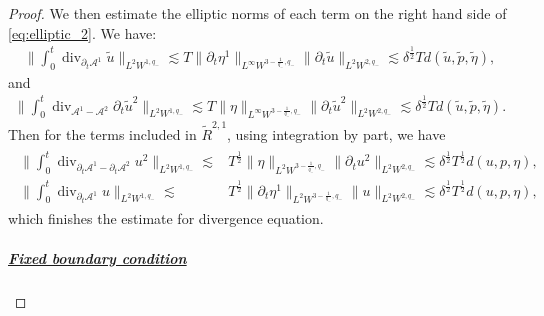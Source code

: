 \documentclass[letterpaper,reqno,10pt,twoside]{amsart}
\theoremstyle{definition}
\theoremstyle{remark}
\def\p{\partial}
\begin{document}
\begin{proof}
			\noindent We then estimate the elliptic norms of each term on the right hand side of \eqref{eq:elliptic_2}. We have:
			\begin{align}
				\|\int_{0}^{t}\operatorname{div}_{\p_{t}\mathcal{A}^{1}}\tilde{u}\|_{L^{2}W^{1,q_{-}}}\lesssim T\|\p_{t}\eta^{1}\|_{L^{\infty}W^{3-\frac{1}{q_{-}},q_{-}}}\|\p_{t}\tilde{u}\|_{L^{2}W^{2,q_{-}}}\lesssim \delta^{\frac{1}{2}}Td(\tilde{u},\tilde{p},\tilde{\eta}),
			\end{align}
			and
			\begin{align}
				\|\int_{0}^{t}\operatorname{div}_{\mathcal{A}^{1}-\mathcal{A}^{2}}\p_{t}\tilde{u}^{2}\|_{L^{2}W^{1,q_{-}}}\lesssim T\|\eta\|_{L^{\infty}W^{3-\frac{1}{q_{-}},q_{-}}}\|\p_{t}\tilde{u}^{2}\|_{L^{2}W^{2,q_{-}}}\lesssim \delta^{\frac{1}{2}}Td(\tilde{u},\tilde{p},\tilde{\eta}).
			\end{align}
			\noindent Then for the terms included in $\tilde{R}^{2,1}$, using integration by part, we have
			\begin{align}
				\begin{aligned}
					\|\int_{0}^{t}\operatorname{div}_{\p_{t}\mathcal{A}^{1}-\p_{t}\mathcal{A}^{2}}{u}^{2}\|_{L^{2}W^{1,q_{-}}}\lesssim&T^{\frac{1}{2}}\|\eta\|_{L^{2}W^{3-\frac{1}{q_{-}},q_{-}}}\|\p_{t}{u}^{2}\|_{L^{2}W^{2,q_{-}}}\lesssim \delta^{\frac{1}{2}}T^{\frac{1}{2}}d({u},{p},{\eta}),\\
					\|\int_{0}^{t}\operatorname{div}_{\p_{t}\mathcal{A}^{1}}{u}\|_{L^{2}W^{1,q_{-}}}\lesssim& T^{\frac{1}{2}}\|\p_{t}\eta^{1}\|_{L^{2}W^{3-\frac{1}{q_{-}},q_{-}}}\|{u}\|_{L^{2}W^{2,q_{-}}}\lesssim \delta^{\frac{1}{2}}T^{\frac{1}{2}}d({u},{p},{\eta}),
				\end{aligned}
			\end{align}
			\noindent which finishes the estimate for divergence equation.
			
			\subparagraph{\underline{Fixed boundary condition}}
			

\end{proof}
\end{document}
